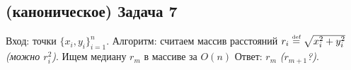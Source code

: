 \documentclass[a4paper]{article}
\def\eqdef{\overset{\mbox{\tiny def}}{=}}
\begin{document}
\subsection*{(каноническое) Задача 7}
Вход: точки $\{x_i,y_i\}_{i=1}^n$.\newline
Алгоритм: считаем массив расстояний $r_i\eqdef \sqrt{x_i^2+y_i^2}$ {\em (можно $r_i^2$)}. Ищем медиану $r_m$ в массиве за $O(n)$\newline
Ответ: $r_{m}$ {\em ($r_{m+1}$?)}.
\end{document}
